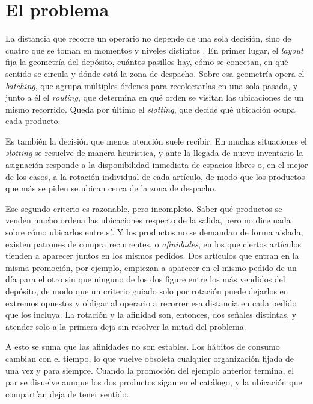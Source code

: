 \section{El problema}

La distancia que recorre un operario no depende de una sola decisión, sino de cuatro que se toman en momentos y niveles distintos \citep{gu2007research, dekoster2007design}.
En primer lugar, el \emph{layout} fija la geometría del depósito, cuántos pasillos hay, cómo se conectan, en qué sentido se circula y dónde está la zona de despacho.
Sobre esa geometría opera el \emph{batching}, que agrupa múltiples órdenes para recolectarlas en una sola pasada, y junto a él el \emph{routing}, que determina en qué orden se visitan las ubicaciones de un mismo recorrido.
Queda por último el \emph{slotting}, que decide qué ubicación ocupa cada producto.

Es también la decisión que menos atención suele recibir.
En muchas situaciones el \emph{slotting} se resuelve de manera heurística, y ante la llegada de nuevo inventario la asignación responde a la disponibilidad inmediata de espacios libres o, en el mejor de los casos, a la rotación individual de cada artículo, de modo que los productos que más se piden se ubican cerca de la zona de despacho.

Ese segundo criterio es razonable, pero incompleto.
Saber qué productos se venden mucho ordena las ubicaciones respecto de la salida, pero no dice nada sobre cómo ubicarlos entre sí.
Y los productos no se demandan de forma aislada, existen patrones de compra recurrentes, o \emph{afinidades}, en los que ciertos artículos tienden a aparecer juntos en los mismos pedidos.
Dos artículos que entran en la misma promoción, por ejemplo, empiezan a aparecer en el mismo pedido de un día para el otro sin que ninguno de los dos figure entre los más vendidos del depósito, de modo que un criterio guiado solo por rotación puede dejarlos en extremos opuestos y obligar al operario a recorrer esa distancia en cada pedido que los incluya.
La rotación y la afinidad son, entonces, dos señales distintas, y atender solo a la primera deja sin resolver la mitad del problema.

A esto se suma que las afinidades no son estables.
Los hábitos de consumo cambian con el tiempo, lo que vuelve obsoleta cualquier organización fijada de una vez y para siempre.
Cuando la promoción del ejemplo anterior termina, el par se disuelve aunque los dos productos sigan en el catálogo, y la ubicación que compartían deja de tener sentido.

